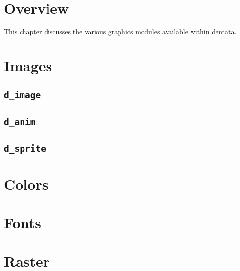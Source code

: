%
% 
% 
\def\FileCreated{Thu Jun 21 02:19:53 2001}
\def\FileRevised{Fri Jun 22 18:37:34 2001}

\section{Overview}

This chapter discusses the various graphics modules available within
dentata.

\section{Images}

\subsection{\tt d\_image}

\subsection{\tt d\_anim}

\subsection{\tt d\_sprite}

\section{Colors}

\section{Fonts}

\section{Raster}
\label{sec:graphraster}
